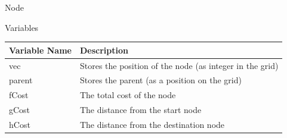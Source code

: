 \documentclass[../Design.tex]{subfiles}
\begin{document}
    Node
    \begin{center}
        Variables
        \begin{tabular}{ | m{} | m{} | }
            \hline
            \textbf{Variable Name} & \textbf{Description} \\
            \hline
            vec & Stores the position of the node (as integer in the grid) \\
            \hline
            parent & Stores the parent (as a position on the grid) \\
            \hline
            fCost & The total cost of the node \\
            \hline
            gCost & The distance from the start node \\
            \hline
            hCost & The distance from the destination node \\
            \hline
        \end{tabular}
    \end{center}
\end{document}
